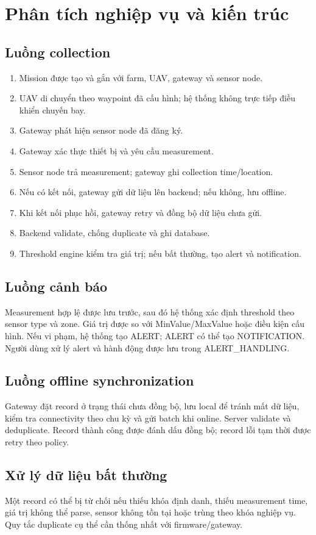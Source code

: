 \chapter{Phân tích nghiệp vụ và kiến trúc}
\section{Luồng collection}
\begin{enumerate}
\item Mission được tạo và gắn với farm, UAV, gateway và sensor node.
\item UAV di chuyển theo waypoint đã cấu hình; hệ thống không trực tiếp điều khiển chuyến bay.
\item Gateway phát hiện sensor node đã đăng ký.
\item Gateway xác thực thiết bị và yêu cầu measurement.
\item Sensor node trả measurement; gateway ghi collection time/location.
\item Nếu có kết nối, gateway gửi dữ liệu lên backend; nếu không, lưu offline.
\item Khi kết nối phục hồi, gateway retry và đồng bộ dữ liệu chưa gửi.
\item Backend validate, chống duplicate và ghi database.
\item Threshold engine kiểm tra giá trị; nếu bất thường, tạo alert và notification.
\end{enumerate}

\section{Luồng cảnh báo}
Measurement hợp lệ được lưu trước, sau đó hệ thống xác định threshold theo sensor type và zone. Giá trị được so với MinValue/MaxValue hoặc điều kiện cấu hình. Nếu vi phạm, hệ thống tạo ALERT; ALERT có thể tạo NOTIFICATION. Người dùng xử lý alert và hành động được lưu trong ALERT\_HANDLING.

\section{Luồng offline synchronization}
Gateway đặt record ở trạng thái chưa đồng bộ, lưu local để tránh mất dữ liệu, kiểm tra connectivity theo chu kỳ và gửi batch khi online. Server validate và deduplicate. Record thành công được đánh dấu đồng bộ; record lỗi tạm thời được retry theo policy.
\section{Xử lý dữ liệu bất thường}
Một record có thể bị từ chối nếu thiếu khóa định danh, thiếu measurement time, giá trị không thể parse, sensor không tồn tại hoặc trùng theo khóa nghiệp vụ. Quy tắc duplicate cụ thể cần thống nhất với firmware/gateway.
